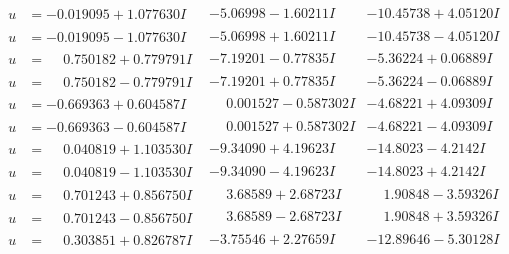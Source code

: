 \documentclass[1p]{elsarticle_modified}
\theoremstyle{definition}
\begin{document}
$$\begin{array}{c|c|c}
\begin{aligned}
u &= -0.019095 + 1.077630 I\end{aligned}
 & -5.06998 - 1.60211 I & -10.45738 + 4.05120 I \\ \hline\begin{aligned}
u &= -0.019095 - 1.077630 I\end{aligned}
 & -5.06998 + 1.60211 I & -10.45738 - 4.05120 I \\ \hline\begin{aligned}
u &= \phantom{-}0.750182 + 0.779791 I\end{aligned}
 & -7.19201 - 0.77835 I & -5.36224 + 0.06889 I \\ \hline\begin{aligned}
u &= \phantom{-}0.750182 - 0.779791 I\end{aligned}
 & -7.19201 + 0.77835 I & -5.36224 - 0.06889 I \\ \hline\begin{aligned}
u &= -0.669363 + 0.604587 I\end{aligned}
 & \phantom{-}0.001527 - 0.587302 I & -4.68221 + 4.09309 I \\ \hline\begin{aligned}
u &= -0.669363 - 0.604587 I\end{aligned}
 & \phantom{-}0.001527 + 0.587302 I & -4.68221 - 4.09309 I \\ \hline\begin{aligned}
u &= \phantom{-}0.040819 + 1.103530 I\end{aligned}
 & -9.34090 + 4.19623 I & -14.8023 - 4.2142 I \\ \hline\begin{aligned}
u &= \phantom{-}0.040819 - 1.103530 I\end{aligned}
 & -9.34090 - 4.19623 I & -14.8023 + 4.2142 I \\ \hline\begin{aligned}
u &= \phantom{-}0.701243 + 0.856750 I\end{aligned}
 & \phantom{-}3.68589 + 2.68723 I & \phantom{-}1.90848 - 3.59326 I \\ \hline\begin{aligned}
u &= \phantom{-}0.701243 - 0.856750 I\end{aligned}
 & \phantom{-}3.68589 - 2.68723 I & \phantom{-}1.90848 + 3.59326 I \\ \hline\begin{aligned}
u &= \phantom{-}0.303851 + 0.826787 I\end{aligned}
 & -3.75546 + 2.27659 I & -12.89646 - 5.30128 I \\ \hline\begin{aligned}

\end{aligned}
\end{array}$$
\end{document}
